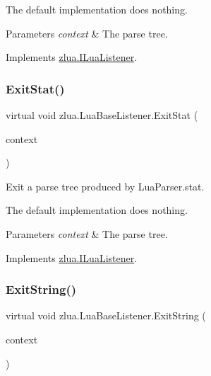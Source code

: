 The default implementation does nothing.


\begin{DoxyParams}{Parameters}
{\em context} & The parse tree.\\
\hline
\end{DoxyParams}


Implements \mbox{\hyperlink{interfacezlua_1_1_i_lua_listener_a4f4bc76c085e375c69f6c34491670d9e}{zlua.\+I\+Lua\+Listener}}.

\mbox{\label{classzlua_1_1_lua_base_listener_abf60a39c358a7aafc2ddaa2fbb05d49d}} 
\subsubsection{\texorpdfstring{Exit\+Stat()}{ExitStat()}}
{\footnotesize\ttfamily virtual void zlua.\+Lua\+Base\+Listener.\+Exit\+Stat (\begin{DoxyParamCaption}\item[{\mbox{[}\+Not\+Null\mbox{]} \mbox{\hyperlink{classzlua_1_1_lua_parser_1_1_stat_context}{Lua\+Parser.\+Stat\+Context}}}]{context }\end{DoxyParamCaption})\hspace{0.3cm}{\ttfamily [virtual]}}



Exit a parse tree produced by Lua\+Parser.\+stat. 

The default implementation does nothing.


\begin{DoxyParams}{Parameters}
{\em context} & The parse tree.\\
\hline
\end{DoxyParams}


Implements \mbox{\hyperlink{interfacezlua_1_1_i_lua_listener_adb5cede64711480ae76ce5eece644ee4}{zlua.\+I\+Lua\+Listener}}.

\mbox{\label{classzlua_1_1_lua_base_listener_ac80dc12b34aee654e56ecc7e37a77ac7}} 
\subsubsection{\texorpdfstring{Exit\+String()}{ExitString()}}
{\footnotesize\ttfamily virtual void zlua.\+Lua\+Base\+Listener.\+Exit\+String (\begin{DoxyParamCaption}\item[{\mbox{[}\+Not\+Null\mbox{]} \mbox{\hyperlink{classzlua_1_1_lua_parser_1_1_string_context}{Lua\+Parser.\+String\+Context}}}]{context }\end{DoxyParamCaption})\hspace{0.3cm}{\ttfamily [virtual]}}



